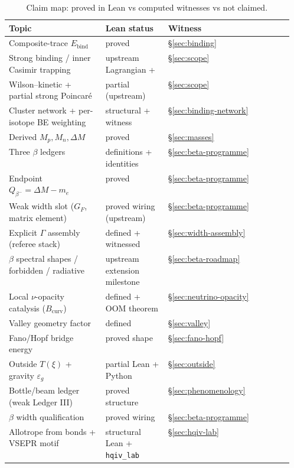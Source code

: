 \documentclass[11pt,notitlepage]{amsart}
\newcommand{\fitbox}[1]{\begin{adjustbox}{max width=\linewidth,center}#1\end{adjustbox}}
\begin{document}
\begin{table}[h]
\centering
\small
\caption{Claim map: proved in Lean vs computed witnesses vs not claimed.}
\label{tab:claims}
\fitbox{%
\begin{tabularx}{\linewidth}{@{}>{\RaggedRight\arraybackslash}p{0.34\linewidth}>{\RaggedRight\arraybackslash}p{0.22\linewidth}X@{}}
\toprule
Topic & Lean status & Witness \\
\midrule
Composite-trace $E_{\mathrm{bind}}$ & proved & \S\ref{sec:binding} \\
Strong binding / inner Casimir trapping & upstream Lagrangian + \cite{hqiv-gluon-curvature-note} & \S\ref{sec:scope} \\
Wilson--kinetic + partial strong Poincaré & partial (upstream) & \S\ref{sec:scope} \\
Cluster network + per-isotope BE weighting & structural + witness & \S\ref{sec:binding-network} \\
Derived $M_p,M_n,\Delta M$ & proved & \S\ref{sec:masses} \\
Three $\beta$ ledgers & definitions + identities & \S\ref{sec:beta-programme} \\
Endpoint $Q_{\beta^-}=\Delta M-m_e$ & proved & \S\ref{sec:beta-programme} \\
Weak width slot ($G_F$, matrix element) & proved wiring (upstream) & \S\ref{sec:beta-programme} \\
Explicit $\Gamma$ assembly (referee stack) & defined + witnessed & \S\ref{sec:width-assembly} \\
$\beta$ spectral shapes / forbidden / radiative & upstream extension milestone & \S\ref{sec:beta-roadmap} \\
Local $\nu$-opacity catalysis ($B_{\mathrm{curv}}$) & defined + OOM theorem & \S\ref{sec:neutrino-opacity} \\
Valley geometry factor & defined & \S\ref{sec:valley} \\
Fano/Hopf bridge energy & proved shape & \S\ref{sec:fano-hopf} \\
Outside $T(\xi)$ + gravity $\varepsilon_g$ & partial Lean + Python & \S\ref{sec:outside} \\
Bottle/beam ledger (weak Ledger III) & proved structure & \S\ref{sec:phenomenology} \\
$\beta$ width qualification & proved wiring & \S\ref{sec:beta-programme} \\
Allotrope from bonds + VSEPR motif & structural Lean + \texttt{hqiv\_lab} & \S\ref{sec:hqiv-lab} \\

\end{tabularx}}
\end{table}
\end{document}
